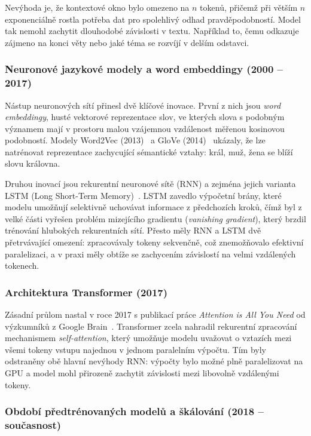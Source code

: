 Nevýhoda je, že kontextové okno bylo omezeno na $n$ tokenů, přičemž při větším $n$ exponenciálně rostla potřeba dat pro spolehlivý odhad pravděpodobností.
Model tak nemohl zachytit dlouhodobé závislosti v textu.
Například to, čemu odkazuje zájmeno na konci věty nebo jaké téma se rozvíjí v delším odstavci.

\subsubsection*{Neuronové jazykové modely a word embeddingy (2000 -- 2017)}
\label{subsubsec:llm-history-neural}

Nástup neuronových sítí přinesl dvě klíčové inovace.
První z nich jsou \textit{word embeddingy}, husté vektorové reprezentace slov, ve kterých slova s podobným významem  mají v prostoru malou vzájemnou vzdálenost měřenou kosinovou podobností.
Modely Word2Vec (2013)~\cite{mikolov-word2vec} a GloVe (2014)~\cite{pennington-glove} ukázaly, že lze natrénovat reprezentace zachycující sémantické vztahy: král, muž, žena se blíží slovu královna.

Druhou inovací jsou rekurentní neuronové sítě (RNN) a zejména jejich varianta LSTM (Long Short-Term Memory)~\cite{hochreiter-lstm}.
LSTM zavedlo výpočetní brány, které modelu umožňují selektivně uchovávat informace z předchozích kroků, čímž byl z velké části vyřešen problém mizejícího gradientu (\textit{vanishing gradient}), který brzdil trénování hlubokých rekurentních sítí.
Přesto měly RNN a LSTM dvě přetrvávající omezení: zpracovávaly tokeny sekvenčně, což znemožňovalo efektivní paralelizaci, a v praxi měly obtíže se zachycením závislostí na velmi vzdálených tokenech.

\subsubsection*{Architektura Transformer (2017)}
\label{subsubsec:llm-history-transformer}

Zásadní průlom nastal v roce 2017 s publikací práce \textit{Attention is All You Need} od výzkumníků z Google Brain~\cite{vaswani-attention}.
Transformer zcela nahradil rekurentní zpracování mechanismem \textit{self-attention}, který umožňuje modelu uvažovat o vztazích mezi všemi tokeny vstupu najednou v jednom paralelním výpočtu.
Tím byly odstraněny obě hlavní nevýhody RNN: výpočty bylo možné plně paralelizovat na GPU a model mohl přirozeně zachytit závislosti mezi libovolně vzdálenými tokeny.

\subsubsection*{Období předtrénovaných modelů a škálování (2018 -- současnost)}
\label{subsubsec:llm-history-pretraining}

